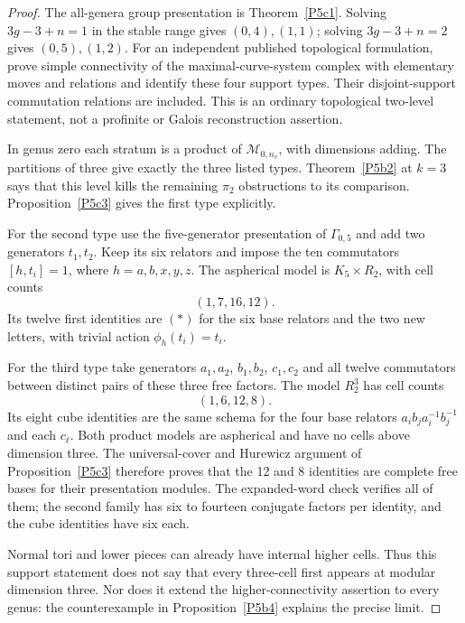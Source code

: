 \begin{proof}
The all-genera group presentation
is Theorem~\ref{P5c1}.
Solving \(3g-3+n=1\) in the stable
range gives \((0,4),(1,1)\);
solving \(3g-3+n=2\) gives
\((0,5),(1,2)\).
For an independent published
topological formulation,
\citet[Section 2, Theorem 2,
and Remark 4]{HatcherLochakSchneps2000}
prove simple connectivity of
the maximal-curve-system complex
with elementary moves and
relations and identify these
four support types. Their
disjoint-support commutation
relations are included.
This is an ordinary topological
two-level statement, not a
profinite or Galois reconstruction
assertion.

In genus zero each stratum is
a product of \(\mathcal M_{0,n_v}\),
with dimensions adding.
The partitions of three give
exactly the three listed types.
Theorem~\ref{P5b2} at \(k=3\)
says that this level kills
the remaining \(\pi_2\)
obstructions to its comparison.
Proposition~\ref{P5c3} gives
the first type explicitly.

For the second type use the
five-generator presentation
of \(\Gamma_{0,5}\) and add
two generators \(t_1,t_2\).
Keep its six relators and
impose the ten commutators
\([h,t_i]=1\), where
\(h=a,b,x,y,z\).
The aspherical model is
\(K_5\times R_2\), with
cell counts
\[
                              (1,7,16,12).
\]
Its twelve first identities
are \((*)\) for the six
base relators and the two
new letters, with trivial
action \(\phi_h(t_i)=t_i\).

For the third type take
generators \(a_1,a_2\),
\(b_1,b_2\), \(c_1,c_2\)
and all twelve commutators
between distinct pairs of
these three free factors.
The model \(R_2^3\) has
cell counts
\[
                               (1,6,12,8).
\]
Its eight cube identities
are the same schema for
the four base relators
\(a_i b_j a_i^{-1}b_j^{-1}\)
and each \(c_\ell\).
Both product models are
aspherical and have no cells
above dimension three.
The universal-cover and
Hurewicz argument of
Proposition~\ref{P5c3}
therefore proves that the
12 and 8 identities are
complete free bases for
their presentation modules.
The expanded-word check
verifies all of them;
the second family has
six to fourteen conjugate
factors per identity,
and the cube identities
have six each.

Normal tori and lower
pieces can already have
internal higher cells.
Thus this support statement
does not say that every
three-cell first appears at
modular dimension three.
Nor does it extend the
higher-connectivity assertion
to every genus: the
counterexample in
Proposition~\ref{P5b4}
explains the precise limit.
\end{proof}

